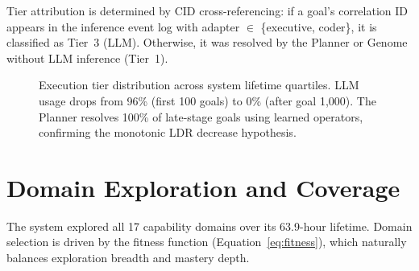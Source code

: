\documentclass[12pt,a4paper]{report}
\begin{document}
Tier attribution is determined by CID cross-referencing: if a goal's correlation ID appears in the inference event log with adapter $\in$ \{executive, coder\}, it is classified as Tier~3 (LLM). Otherwise, it was resolved by the Planner or Genome without LLM inference (Tier~1).

\begin{figure}[H]
\centering
{}
\caption{Execution tier distribution across system lifetime quartiles. LLM usage drops from 96\% (first 100 goals) to 0\% (after goal 1{,}000). The Planner resolves 100\% of late-stage goals using learned operators, confirming the monotonic LDR decrease hypothesis.}
\label{fig:tier-distribution}
\end{figure}

\section{Domain Exploration and Coverage}

The system explored all 17 capability domains over its 63.9-hour lifetime. Domain selection is driven by the fitness function (Equation~\ref{eq:fitness}), which naturally balances exploration breadth and mastery depth.
\end{document}
